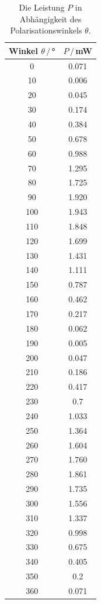 \begin{table}[H]
    \center
    \caption{Die Leistung $P$ in Abhängigkeit des Polarisationswinkels $\theta$.}
    \begin{tabular}{c c}
        \toprule
        Winkel $\theta\,/\,$° & $P\,/\,$mW\\
        \midrule
        0&       0.071\\
        10&      0.006\\
        20&      0.045\\
        30&      0.174\\
        40&      0.384\\
        50&      0.678\\
        60&      0.988\\
        70&      1.295\\
        80&      1.725\\
        90&      1.920\\
        100&     1.943\\
        110&     1.848\\
        120&     1.699\\
        130&     1.431\\
        140&     1.111\\
        150&     0.787\\
        160&     0.462\\
        170&     0.217\\
        180&     0.062\\
        190&     0.005\\
        200&     0.047\\
        210&     0.186\\
        220&     0.417\\
        230&     0.7  \\
        240&     1.033\\
        250&     1.364\\
        260&     1.604\\
        270&     1.760\\
        280&     1.861\\
        290&    1.735\\
        300&     1.556\\
        310&     1.337\\
        320&     0.998\\
        330&     0.675\\
        340&     0.405\\
        350&     0.2\\
        360&     0.071\\        
        \bottomrule
    \end{tabular}
    \label{tab:pol}
\end{table}


